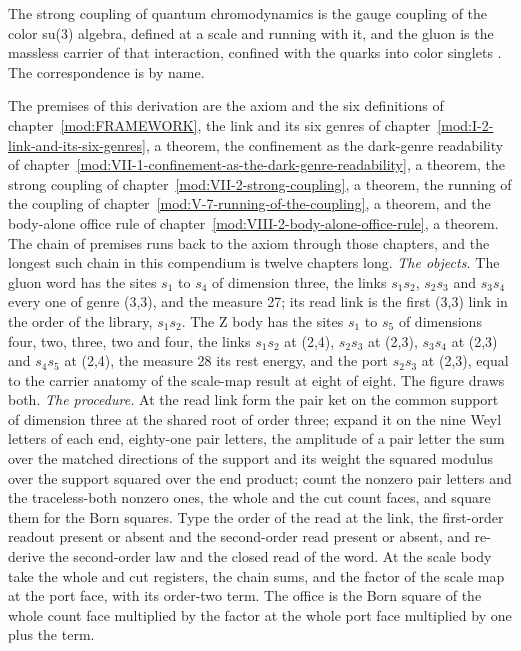 \begin{chbridge}
The strong coupling of quantum chromodynamics is the gauge coupling of the color su(3) algebra, defined at a scale and running with it, and the gluon is the massless carrier of that interaction, confined with the quarks into color singlets \cite{Gross1973,Politzer1973}. The correspondence is by name.
\end{chbridge}
\begin{chproof}
The premises of this derivation are the axiom and the six definitions of chapter~\ref{mod:FRAMEWORK}, the link and its six genres of chapter~\ref{mod:I-2-link-and-its-six-genres}, a theorem, the confinement as the dark-genre readability of chapter~\ref{mod:VII-1-confinement-as-the-dark-genre-readability}, a theorem, the strong coupling of chapter~\ref{mod:VII-2-strong-coupling}, a theorem, the running of the coupling of chapter~\ref{mod:V-7-running-of-the-coupling}, a theorem, and the body-alone office rule of chapter~\ref{mod:VIII-2-body-alone-office-rule}, a theorem. The chain of premises runs back to the axiom through those chapters, and the longest such chain in this compendium is twelve chapters long.
\textit{The objects.} The gluon word has the sites $s_{1}$ to $s_{4}$ of dimension three, the links $s_{1}s_{2}$, $s_{2}s_{3}$ and $s_{3}s_{4}$ every one of genre (3,3), and the measure 27; its read link is the first (3,3) link in the order of the library, $s_{1}s_{2}$. The Z body has the sites $s_{1}$ to $s_{5}$ of dimensions four, two, three, two and four, the links $s_{1}s_{2}$ at (2,4), $s_{2}s_{3}$ at (2,3), $s_{3}s_{4}$ at (2,3) and $s_{4}s_{5}$ at (2,4), the measure 28 its rest energy, and the port $s_{2}s_{3}$ at (2,3), equal to the carrier anatomy of the scale-map result at eight of eight. The figure draws both.
\textit{The procedure.} At the read link form the pair ket on the common support of dimension three at the shared root of order three; expand it on the nine Weyl letters of each end, eighty-one pair letters, the amplitude of a pair letter the sum over the matched directions of the support and its weight the squared modulus over the support squared over the end product; count the nonzero pair letters and the traceless-both nonzero ones, the whole and the cut count faces, and square them for the Born squares. Type the order of the read at the link, the first-order readout present or absent and the second-order read present or absent, and re-derive the second-order law and the closed read of the word. At the scale body take the whole and cut registers, the chain sums, and the factor of the scale map at the port face, with its order-two term. The office is the Born square of the whole count face multiplied by the factor at the whole port face multiplied by one plus the term.

\end{chproof}
